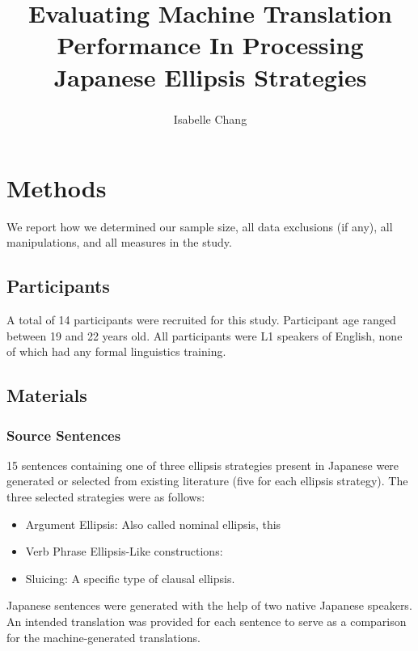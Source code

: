\documentclass[
  man,floatsintext]{apa6}
\title{Evaluating Machine Translation Performance In Processing Japanese Ellipsis Strategies}
\author{Isabelle Chang\textsuperscript{}}
\date{}
\affiliation{\vspace{0.5cm}\textsuperscript{1} Rutgers University}
\providecommand{\tightlist}{%
  \setlength{\itemsep}{0pt}\setlength{\parskip}{0pt}}
\begin{document}
\maketitle

\hypertarget{methods}{%
\section{Methods}\label{methods}}

We report how we determined our sample size, all data exclusions (if any), all manipulations, and all measures in the study.

\hypertarget{participants}{%
\subsection{Participants}\label{participants}}

A total of 14 participants were recruited for this study. Participant age ranged between 19 and 22 years old. All participants were L1 speakers of English, none of which had any formal linguistics training.

\hypertarget{materials}{%
\subsection{Materials}\label{materials}}

\hypertarget{source-sentences}{%
\subsubsection{Source Sentences}\label{source-sentences}}

15 sentences containing one of three ellipsis strategies present in Japanese were generated or selected from existing literature (five for each ellipsis strategy). The three selected strategies were as follows:

\begin{itemize}
\tightlist
\item
  Argument Ellipsis: Also called nominal ellipsis, this
\item
  Verb Phrase Ellipsis-Like constructions:
\item
  Sluicing: A specific type of clausal ellipsis.
\end{itemize}

Japanese sentences were generated with the help of two native Japanese speakers. An intended translation was provided for each sentence to serve as a comparison for the machine-generated translations.
\end{document}
